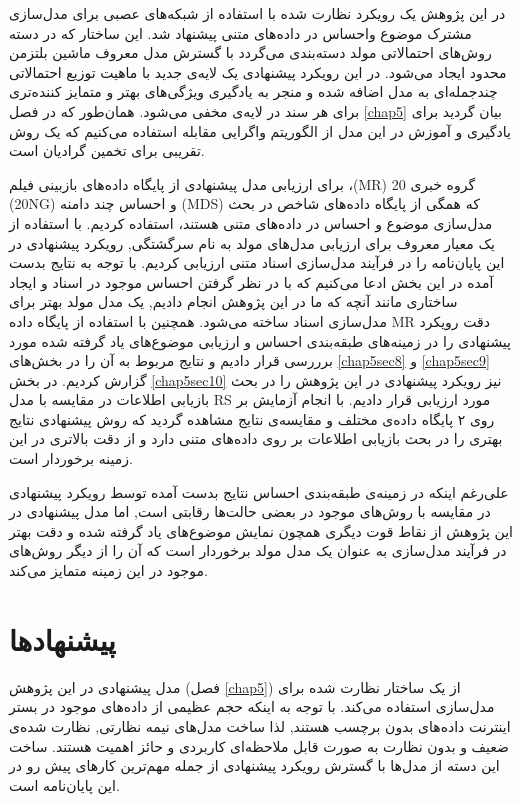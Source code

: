 در این پژوهش یک رویکرد نظارت شده با استفاده از شبکه‌های عصبی برای مدل‌سازی مشترک موضوع واحساس در داده‌های متنی پیشنهاد شد. این ساختار که در دسته روش‌های احتمالاتی مولد دسته‌بندی می‌گردد با گسترش مدل معروف ماشین بلتزمن محدود ایجاد می‌شود. در این رویکرد پیشنهادی یک لایه‌ی جدید با ماهیت توزیع احتمالاتی چندجمله‌ای به مدل اضافه شده و منجر به یادگیری ویژگی‌های بهتر و متمایز کننده‌تری برای هر سند در لایه‌ی مخفی
می‌شود. همان‌طور که در فصل 
\ref{chap5}
بیان گردید برای یادگیری و آموزش در این مدل از الگوریتم واگرایی مقابله استفاده می‌کنیم که یک روش تقریبی برای تخمین گرادیان است.

برای ارزیابی مدل پیشنهادی از پایگاه داده‌های بازبینی فیلم
،(MR)
 20 گروه خبری 
(20NG)
 و احساس چند دامنه 
(MDS)
 که همگی از پایگاه داده‌های شاخص در بحث مدل‌سازی موضوع و احساس  در داده‌های متنی هستند، استفاده کردیم. با استفاده از یک معيار معروف برای ارزیابی مدل‌های مولد به نام سرگشتگی, رویکرد پیشنهادی در این پایان‌‌نامه را در فرآیند مدل‌سازی اسناد متنی ارزیابی کردیم. با توجه به نتایج بدست آمده در این بخش ادعا می‌کنیم که با در نظر گرفتن احساس موجود در اسناد و ایجاد ساختاری مانند آنچه که ما در این پژوهش انجام دادیم, یک مدل مولد بهتر برای مدل‌سازی اسناد ساخته می‌شود. همچنین با استفاده از پایگاه داده 
MR
 دقت رویکرد پیشنهادی را در زمینه‌های طبقه‌بندی احساس و ارزیابی موضوع‌های یاد گرفته شده مورد برررسی قرار دادیم و نتایج مربوط به آن را در بخش‌های
\ref{chap5sec8}
و
\ref{chap5sec9}
گزارش کردیم. در بخش
\ref{chap5sec10}
نیز رویکرد پیشنهادی در این پژوهش را در بحث بازیابی اطلاعات در مقایسه با مدل
RS
مورد ارزیابی قرار دادیم. با انجام آزمایش بر روی ۲ پایگاه داده‌‌ی مختلف و مقایسه‌ی نتایج مشاهده گردید که روش پیشنهادی نتایج بهتری را در بحث بازیابی اطلاعات بر روی داده‌های متنی دارد و از دقت بالاتری در این زمینه برخوردار است.

علی‌رغم اینکه در زمینه‌ی طبقه‌بندی احساس نتایج بدست آمده توسط رویکرد پیشنهادی در مقایسه با روش‌های موجود در بعضی حالت‌ها رقابتی است, اما مدل پیشنهادی در این پژوهش از نقاط قوت دیگری همچون نمایش موضوع‌های یاد گرفته شده و دقت بهتر در فرآیند مدل‌سازی به عنوان یک مدل مولد برخوردار است که آن را از دیگر روش‌های موجود در این زمینه متمایز می‌کند.


\section{پیشنهاد‌ها}
مدل پیشنهادی در این پژوهش
(فصل 
\ref{chap5})
از یک ساختار نظارت شده برای مدل‌سازی استفاده می‌کند. با توجه به اینکه حجم عظیمی از داده‌های موجود در بستر اینترنت داده‌های بدون برچسب هستند, لذا ساخت مدل‌های نیمه نظارتی, نظارت شده‌ی ضعیف و بدون نظارت به صورت قابل ملاحظه‌ای کاربردی و حائز اهمیت هستند. ساخت این دسته از مدل‌ها با گسترش رویکرد پیشنهادی از جمله مهم‌ترین کارهای پیش‌ رو در این پایان‌نامه است. 

